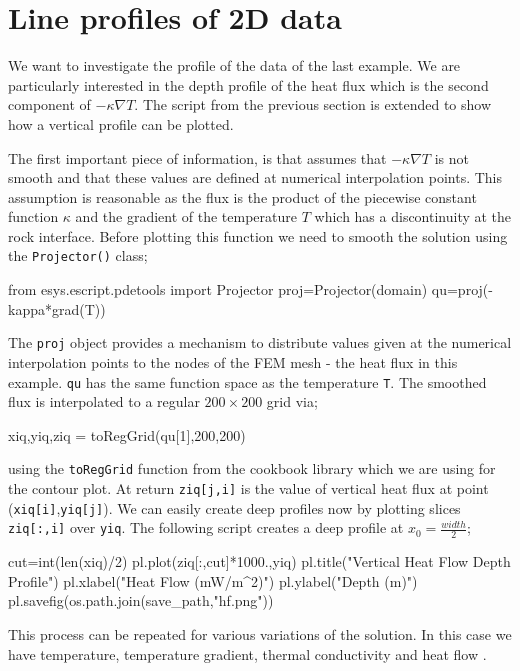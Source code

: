 \section{Line profiles of 2D data}
We want to investigate the profile of the data of the last example. 
We are particularly interested in the depth profile of the heat flux which is
the second component of $-\kappa \nabla T$. The script from the previous section is extended
to show how a vertical profile can be plotted.

The first important piece of information, is that \esc assumes that $-\kappa \nabla T$ is not smooth and
that these values are defined at numerical interpolation points. This assumption is reasonable as
the flux is the product of the piecewise constant function $\kappa$ and 
the gradient of the temperature $T$ which has a discontinuity at the rock interface. 
Before plotting this function we need to smooth the solution using the 
\verb|Projector()| class;
\begin{python}
from esys.escript.pdetools import Projector
proj=Projector(domain)
qu=proj(-kappa*grad(T))
\end{python}
The \verb|proj| object provides a mechanism to distribute values given at the numerical interpolation points to the nodes
of the FEM mesh - the heat flux in this example. \verb|qu| has the same function space
as the temperature \verb|T|. The smoothed flux is interpolated 
to a regular $200\times 200$ grid via;
\begin{python}
xiq,yiq,ziq = toRegGrid(qu[1],200,200)
\end{python}
using the \verb|toRegGrid| function from the cookbook library which we are using for the contour plot.
At return \verb|ziq[j,i]| is the value of vertical heat flux at point 
(\verb|xiq[i]|,\verb|yiq[j]|). We can easily create deep profiles now by
plotting slices \verb|ziq[:,i]| over \verb|yiq|. The following script
creates a deep profile at $x_{0}=\frac{width}{2}$;
\begin{python}
cut=int(len(xiq)/2)
pl.plot(ziq[:,cut]*1000.,yiq)
pl.title("Vertical Heat Flow Depth Profile")
pl.xlabel("Heat Flow (mW/m^2)")
pl.ylabel("Depth (m)")
pl.savefig(os.path.join(save_path,"hf.png"))
\end{python}
This process can be repeated for various variations of the solution. In this case we have temperature, temperature gradient, thermal conductivity and heat flow .

